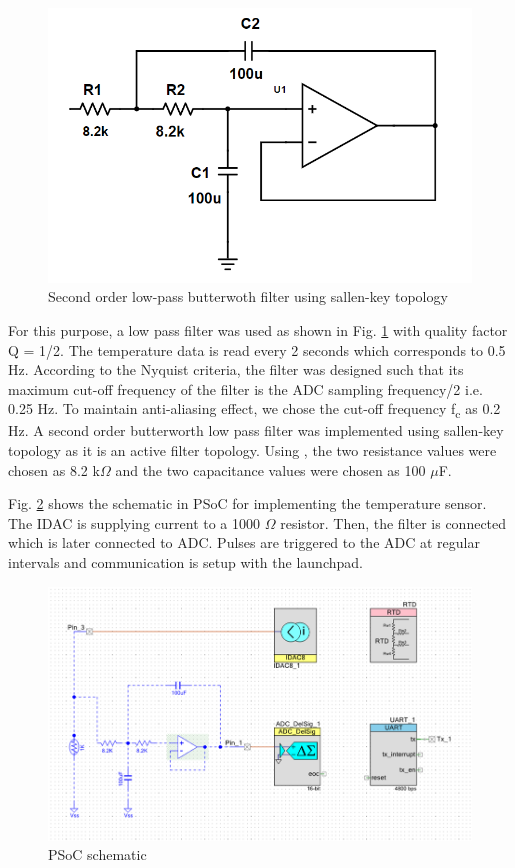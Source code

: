 \documentclass[conference]{IEEEtran}
\begin{document}
\begin{figure}[htbp]
	\centerline{\includegraphics[width=\columnwidth, height=0.3\textheight]{06_sallen_key_filter}}
	\caption{Second order low-pass butterwoth filter using sallen-key topology}
	\label{fig:filter}
\end{figure}

For this purpose, a low pass filter was used as shown in Fig. \ref{fig:filter} with quality factor Q = 1/2. The temperature data is read every 2 seconds which corresponds to 0.5 Hz. According to the Nyquist criteria, the filter was designed such that its maximum cut-off frequency of the filter is the ADC sampling frequency/2 i.e. 0.25 Hz. To maintain anti-aliasing effect, we chose the cut-off frequency f\textsubscript{c} as 0.2 Hz. A second order butterworth low pass filter was implemented using sallen-key topology as it is an active filter topology. Using \cite{b2}, the two resistance values were chosen as 8.2 k$\Omega$ and the two capacitance values were chosen as 100 $\mu$F. 

Fig. \ref{fig:afc} shows the schematic in PSoC for implementing the temperature sensor. The IDAC is supplying current to a 1000 $\Omega$ resistor. Then, the filter is connected which is later connected to ADC. Pulses are triggered to the ADC at regular intervals and communication is setup with the launchpad.
\begin{figure}[htbp]
	\centerline{\includegraphics[width=\columnwidth, height=0.3\textheight]{04_psoc_with_filter}}
	\caption{PSoC schematic}
\label{fig:afc}
\end{figure}
\end{document}
